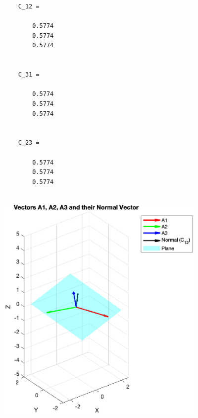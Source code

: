 \documentclass{article}
\begin{document}
		 \begin{verbatim}
	C_12 =
	
		0.5774
		0.5774
		0.5774
	
	
	C_31 =
	
		0.5774
		0.5774
		0.5774
	
	
	C_23 =
	
		0.5774
		0.5774
		0.5774
	
	\end{verbatim} 
		\centering
	\includegraphics [width=4in]{untitled2_01.eps}
	
	
		
\end{document}
